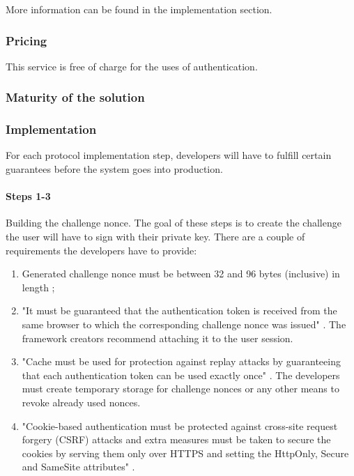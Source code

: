  More information can be found in the implementation section.

\subsubsection{Pricing}

This service is free of charge for the uses of authentication.

\subsubsection{Maturity of the solution}


\subsubsection{Implementation}

For each protocol implementation step, developers will have to fulfill certain guarantees before the system goes into production.

\paragraph{Steps 1-3}

Building the challenge nonce. The goal of these steps is to create the challenge the user will have to sign with their private key. There are a couple of requirements the developers have to provide:
\begin{enumerate}
  \item Generated challenge nonce must be between 32 and 96 bytes (inclusive) in length \cite{ria-webeid-source-web-eid-app-authenticate};
  \item "It must be guaranteed that the authentication token is received from the same browser to which the corresponding challenge nonce was issued" \cite{ria-webeid-source-web-eid-authtoken-validation-java-readme}. The framework creators recommend attaching it to the user session.
  \item "Cache must be used for protection against replay attacks by guaranteeing that each authentication token can be used exactly once" \cite{ria-webeid-source-web-eid-authtoken-validation-java-readme}. The developers must create temporary storage for challenge nonces or any other means to revoke already used nonces.
  \item "Cookie-based authentication must be protected against cross-site request forgery (CSRF) attacks and extra measures must be taken to secure the cookies by serving them only over HTTPS and setting the HttpOnly, Secure and SameSite attributes" \cite{ria-webeid-source-web-eid-authtoken-validation-java-readme}.
\end{enumerate}

